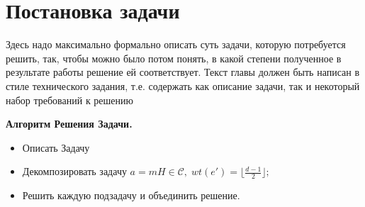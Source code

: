 
\section{Постановка задачи}

Здесь надо максимально формально описать суть задачи, которую потребуется решить, так, чтобы можно было потом понять, в какой степени полученное в результате работы решение ей соответствует. Текст главы должен быть написан в стиле технического задания, т.е. содержать как описание задачи, так и некоторый набор требований к решению

\textbf{Алгоритм Решения Задачи.}
\begin{itemize}
\item[1.] Описать Задачу
\item[2.] Декомпозировать задачу $a=mH\in\mathcal
C,\;wt(e')=\lfloor\frac{d-1}2\rfloor;$
\item[3.] Решить каждую подзадачу и объединить решение.
\end{itemize}
